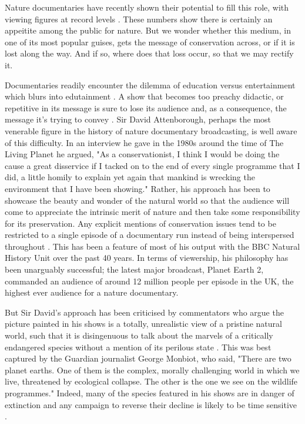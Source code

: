 \documentclass[12pt,letterpaper]{article}
\begin{document}
Nature documentaries have recently shown their potential to fill this role, with viewing figures at record levels \cite{wunder2013taxing,janpol2016does}. These numbers show there is certainly an appeitite among the public for nature. But we wonder whether this medium, in one of its most popular guises, gets the message of conservation across, or if it is lost along the way. And if so, where does that loss occur, so that we may rectify it.

Documentaries readily encounter the dilemma of education versus entertainment which blurs into edutainment \cite{bagust2008screen}. A show that becomes too preachy didactic, or repetitive in its message is sure to lose its audience and, as a consequence, the message it's trying to convey \cite{janpol2016does}. Sir David Attenborough, perhaps the most venerable figure in the history of nature documentary broadcasting, is well aware of this difficulty. In an interview he gave in the 1980s \cite{burgess1984exploring} around the time of The Living Planet he argued, "As a conservationist, I think I would be doing the cause a great disservice if I tacked on to the end of every single programme that I did, a little homily to explain yet again that mankind is wrecking the environment that I have been showing." Rather, his approach has been to showcase the beauty and wonder of the natural world so that the audience will come to appreciate the intrinsic merit of nature and then take some responsibility for its preservation. Any explicit mentions of conservation issues tend to be restricted to a single episode of a documentary run instead of being interspersed throughout \cite{richards2013greening}. This has been a feature of most of his output with the BBC Natural History Unit over the past 40 years. In terms of viewership, his philosophy has been unarguably successful; the latest major broadcast, Planet Earth 2, commanded an audience of around 12 million people per episode in the UK, the highest ever audience for a nature documentary. 

But Sir David's approach has been criticised by commentators who argue the picture painted in his shows is a totally, unrealistic view of a pristine natural world, such that it is disingenuous to talk about the marvels of a critically endangered species without a mention of its perilous state \cite{jeffries2003bbc}. This was best captured by the Guardian journalist George Monbiot, who said, "There are two planet earths. One of them is the complex, morally challenging world in which we live, threatened by ecological collapse. The other is the one we see on the wildlife programmes." Indeed, many of the species featured in his shows are in danger of extinction and any campaign to reverse their decline is likely to be time sensitive \cite{biggs2013legal,turvey2007first}. 
\end{document}
